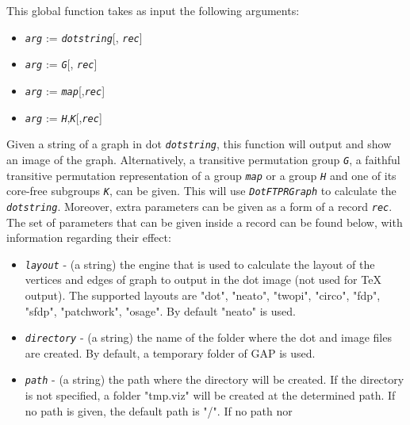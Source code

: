 \documentclass[a4paper,11pt]{report}
\begin{document}
{{{ This global function takes as input the following arguments: 
\begin{itemize}
\item  \mbox{\texttt{\mdseries\slshape arg}} := \mbox{\texttt{\mdseries\slshape dotstring}}[, \mbox{\texttt{\mdseries\slshape rec}}] 
\item  \mbox{\texttt{\mdseries\slshape arg}} := \mbox{\texttt{\mdseries\slshape G}}[, \mbox{\texttt{\mdseries\slshape rec}}] 
\item  \mbox{\texttt{\mdseries\slshape arg}} := \mbox{\texttt{\mdseries\slshape map}}[,\mbox{\texttt{\mdseries\slshape rec}}] 
\item  \mbox{\texttt{\mdseries\slshape arg}} := \mbox{\texttt{\mdseries\slshape H}},\mbox{\texttt{\mdseries\slshape K}}[,\mbox{\texttt{\mdseries\slshape rec}}] 
\end{itemize}
 Given a string of a graph in dot \mbox{\texttt{\mdseries\slshape dotstring}}, this function will output and show an image of the graph. Alternatively, a
transitive permutation group \mbox{\texttt{\mdseries\slshape G}}, a faithful transitive permutation representation of a group \mbox{\texttt{\mdseries\slshape map}} or a group \mbox{\texttt{\mdseries\slshape H}} and one of its core-free subgroups \mbox{\texttt{\mdseries\slshape K}}, can be given. This will use \mbox{\texttt{\mdseries\slshape DotFTPRGraph}} to calculate the \mbox{\texttt{\mdseries\slshape dotstring}}. Moreover, extra parameters can be given as a form of a record \mbox{\texttt{\mdseries\slshape rec}}. The set of parameters that can be given inside a record can be found below,
with information regarding their effect: 
\begin{itemize}
\item  \mbox{\texttt{\mdseries\slshape layout}} - (a string) the engine that is used to calculate the layout of the vertices
and edges of graph to output in the dot image (not used for TeX output). The
supported layouts are "dot", "neato", "twopi", "circo", "fdp", "sfdp",
"patchwork", "osage". By default "neato" is used. 
\item  \mbox{\texttt{\mdseries\slshape directory}} - (a string) the name of the folder where the dot and image files are created.
By default, a temporary folder of GAP is used. 
\item  \mbox{\texttt{\mdseries\slshape path}} - (a string) the path where the directory will be created. If the directory is
not specified, a folder "tmp.viz" will be created at the determined path. If
no path is given, the default path is "\texttt{}/". If no path nor

\end{itemize}}}}
\end{document}
